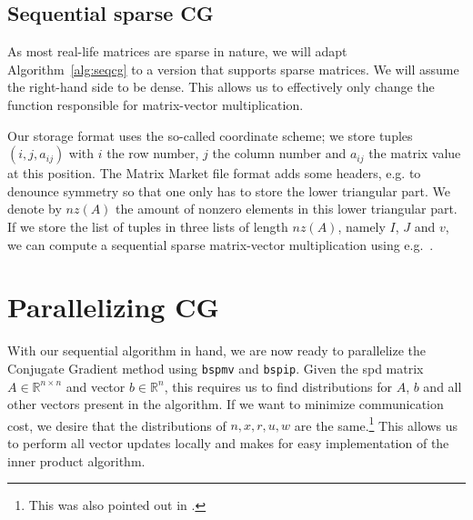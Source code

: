\documentclass[11pt]{amsart}
\theoremstyle{definition}
\newcommand{\R}{\mathbb{R}}
\begin{document}
\subsection{Sequential sparse CG}
As most real-life matrices are sparse in nature, we will adapt Algorithm~\ref{alg:seqcg} to a version that supports sparse matrices. We will assume the right-hand side to be dense. This allows us to effectively only change the function responsible for matrix-vector multiplication.

Our storage format uses the so-called coordinate scheme; we store tuples $(i, j, a_{ij})$ with $i$ the row number, $j$ the column number and $a_{ij}$ the matrix value at this position. The Matrix Market file format adds some headers, e.g. to denounce symmetry so that one only has to store the lower triangular part. We denote by $nz(A)$ the amount of nonzero elements in this lower triangular part. If we store the list of tuples in three lists of length $nz(A)$, namely $I$, $J$ and $v$, we can compute a sequential sparse matrix-vector multiplication using e.g.~\cite[Alg.~4.3]{biss04}.
\section{Parallelizing CG}
\label{sec:parcg}
With our sequential algorithm in hand, we are now ready to parallelize the Conjugate Gradient method using \texttt{bspmv} and \texttt{bspip}. Given the spd matrix $A \in \R^{n \times n}$ and vector $b \in \R^n$, this requires us to find distributions for $A$, $b$ and all other vectors present in the algorithm. If we want to minimize communication cost, we desire that the distributions of $n, x, r, u, w$ are the same.\footnote{This was also pointed out in \cite[p.~174]{biss04}.} This allows us to perform all vector updates locally and makes for easy implementation of the inner product algorithm.
\end{document}
